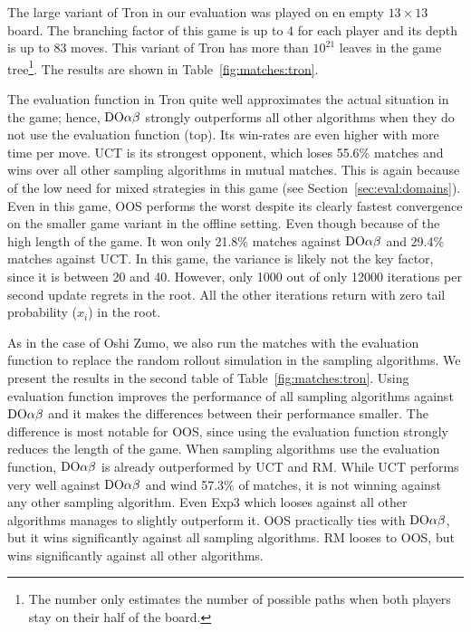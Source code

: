 The large variant of Tron in our evaluation was played on en empty $13\times 13$ board. The branching factor of this game is up to 4 for each player and its depth is up to 83 moves. This variant of Tron has more than $10^{21}$ leaves in the game tree\footnote{The number only estimates the number of possible paths when both players stay on their half of the board.}.
The results are shown in Table~\ref{fig:matches:tron}.

The evaluation function in Tron quite well approximates the actual situation in the game; hence, $\textrm{DO}\alpha\beta$ strongly outperforms all other algorithms when they do not use the evaluation function (top). Its win-rates are even higher with more time per move.
UCT is its strongest opponent, which loses 55.6\% matches and wins over all other sampling algorithms in mutual matches. This is again because of the low need for mixed strategies in this game (see Section~\ref{sec:eval:domains}).
Even in this game, OOS performs the worst despite its clearly fastest convergence on the smaller game variant in the offline setting. 
Even though  because of the high length of the game.
It won only 21.8\% matches against $\textrm{DO}\alpha\beta$ and 29.4\% matches against UCT.
In this game, the variance is likely not the key factor, since it is between 20 and 40.
However, only 1000 out of only 12000 iterations per second update regrets in the root.
All the other iterations return with zero tail probability ($x_i$) in the root. 


As in the case of Oshi Zumo, we also run the matches with the evaluation function to replace the random rollout simulation in the sampling algorithms.
We present the results in the second table of Table~\ref{fig:matches:tron}.
Using evaluation function improves the performance of all sampling algorithms against $\textrm{DO}\alpha\beta$ and it makes the differences between their performance smaller.
The difference is most notable for OOS, since using the evaluation function strongly reduces the length of the game.
When sampling algorithms use the evaluation function, $\textrm{DO}\alpha\beta$ is already outperformed by UCT and RM.
While UCT performs very well against $\textrm{DO}\alpha\beta$ and wind 57.3\% of matches, it is not winning against any other sampling algorithm. 
Even Exp3 which looses against all other algorithms manages to slightly outperform it.
OOS practically ties with $\textrm{DO}\alpha\beta$, but it wins significantly against all sampling algorithms.
RM looses to OOS, but wins significantly against all other algorithms.


